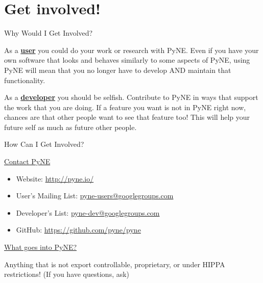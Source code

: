 \documentclass[xcolor=x11names,compress]{beamer}
\renewcommand{\(}{\begin{columns}}
\renewcommand{\)}{\end{columns}}
\newcommand{\<}[1]{\begin{column}{#1}}
\renewcommand{\>}{\end{column}}
\begin{document}
\section{Get involved!}
\begin{frame}{Why Would I Get Involved?}

As a \underline{\textcolor{byellow}{\textbf{user}}} you could do your work or research with PyNE.  Even if you have your own software that looks and behaves similarly to some aspects of PyNE, using PyNE will mean that you no longer have to develop AND maintain that functionality.

\vspace*{2 em}
As a \underline{\textcolor{byellow}{\textbf{developer}}} you should be selfish.  Contribute to PyNE in ways that support the work that you are doing. If a feature you want is not in PyNE right now, chances are that other people want to see that feature too! This will help your future self as much as future other people.

\end{frame}

\begin{frame}{How Can I Get Involved?}

    \underline{\textcolor{byellow}{Contact PyNE}}
    \begin{itemize}
    \item Website: \href{http://pyne.io/}{http://pyne.io/}
    \item User's Mailing List: \href{pyne-users@googlegroups.com}{pyne-users@googlegroups.com}
    \item Developer's List: \href{pyne-dev@googlegroups.com}{pyne-dev@googlegroups.com}
    \item GitHub: \href{https://github.com/pyne/pyne}{https://github.com/pyne/pyne}
    \end{itemize}
    
    \vspace*{2 em}
    \underline{\textcolor{byellow}{What goes into PyNE?}}

    Anything that is not export controllable, proprietary, 
    or under HIPPA restrictions!  (If you have questions, ask)
  
\end{frame}
\end{document}

